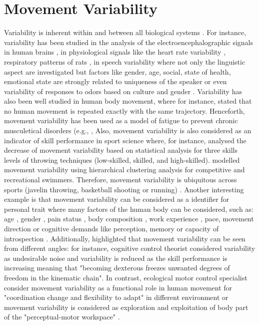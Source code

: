 \section{Movement Variability}
Variability is inherent within and between all biological systems \cite{newell1993}.
For instance, variability has been studied in the analysis of the electroencephalographic 
signals in human brains \cite{klonowski2007}, in physiological signals like the heart 
rate variability \cite{schumacher2004, acharya2006}, respiratory patterns of rats \cite{dhingra2011}, 
in speech variability where not only the linguistic aspect are investigated but 
factors like gender, age, social, state of health, emotional state are
strongly related to uniqueness of the speaker \cite{benzeghiba2007}
or even variability of responses to odors based on culture and gender \cite{ferdenzi2013}.
Variability has also been well studied in human body movement, where 
for instance, \cite{bernstein1967} stated that no human movement is repeated exactly 
with the same trajectory.
Henceforth, movement variability has been used 
as a model of fatigue to prevent 
chronic musculetical disorders (e.g.,  \cite{mathiassen2006, srinivasan2012},
Also, movement variability is also considered as an indicator of skill performance
in sport science where, for instance, \cite{wagner2012} analysed the decrease of movement 
variability based on statistical analysis for three skills levels of 
throwing techniques (low-skilled, skilled, and high-skilled).
\cite{seifert2011} modelled movement variability using hierarchical clustering 
analysis for competitive and recreational swimmers.
Therefore, movement variability is ubiquitous across sports 
(javelin throwing, basketball shooting or running) \cite{bartlett2007}.
Another interesting example is that movement variability can be considered as a 
identifier for personal trait \cite{sandlund2017} where many factors 
of the human body can be considered, such as:
age \cite{kruger2013, macdonald2006, vaillancourt2003},
gender \cite{svendsen2010},
pain status \cite{madeleine2008, sandlund2008},
body composition  \cite{chiari2002},
work experience \cite{madeleine2009},
pace, movement direction or cognitive demands  
like perception, memory or capacity of introspection \cite{srinivasan2012, kanai2011}.
Additionally, \cite{bartlett2007} highlighted that movement variability can be 
seen from different angles: for instance, cognitive control theorist considered 
variability as undesirable noise and variability is reduced as the skill performance 
is increasing meaning that "becoming dexterous freezes unwanted degrees of freedom 
in the kinematic chain".
In contrast, ecological motor control specialist consider movement variability 
as a functional role in human movement for "coordination change and flexibility to adapt" 
in different environment or movement variability is considered as exploration
and exploitation of body part of the "perceptual-motor workspace" \cite{wu2014, herzfeld2014}.

